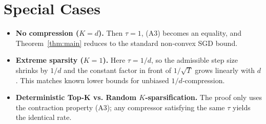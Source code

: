 \documentclass{article}
\begin{document}
\section*{Special Cases}
\begin{itemize}
\item \textbf{No compression ($K=d$).} Then $\tau=1$, (A3) becomes an equality, and Theorem~\ref{thm:main} reduces to the standard non‑convex SGD bound.
\item \textbf{Extreme sparsity ($K=1$).} Here $\tau=1/d$, so the admissible step size shrinks by $1/d$ and the constant factor in front of $1/\sqrt{T}$ grows linearly with $d$. This matches known lower bounds for unbiased $1/d$‑compression.
\item \textbf{Deterministic Top‑K vs. Random $K$‑sparsification.} The proof only uses the contraction property (A3); any compressor satisfying the same $\tau$ yields the identical rate.
\end{itemize}
\end{document}
